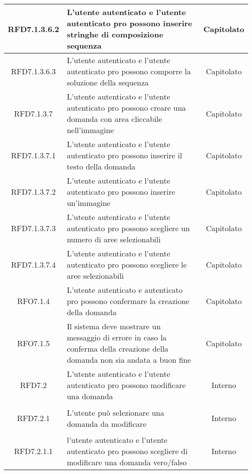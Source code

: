\begin{longtable}{|c|>{\centering}m{7cm}|c|}
\hypertarget{RFD7.1.3.6.2}{RFD7.1.3.6.2} & L’utente autenticato e l’utente autenticato pro possono inserire stringhe di composizione sequenza & Capitolato
\\ \hline

\hypertarget{RFD7.1.3.6.3}{RFD7.1.3.6.3} & L’utente autenticato e l’utente autenticato pro possono comporre la soluzione della sequenza & Capitolato
\\ \hline

\hypertarget{RFD7.1.3.7}{RFD7.1.3.7} & L’utente autenticato e l’utente autenticato pro possono creare una domanda con area cliccabile nell’immagine & Capitolato
\\ \hline

\hypertarget{RFD7.1.3.7.1}{RFD7.1.3.7.1} & L’utente autenticato e l’utente autenticato pro possono inserire il testo della domanda & Capitolato
\\ \hline

\hypertarget{RFD7.1.3.7.2}{RFD7.1.3.7.2} & L’utente autenticato e l’utente autenticato pro possono inserire un’immagine & Capitolato
\\ \hline

\hypertarget{RFD7.1.3.7.3}{RFD7.1.3.7.3} & L’utente autenticato e l’utente autenticato pro possono scegliere un numero di aree selezionabili & Capitolato
\\ \hline

\hypertarget{RFD7.1.3.7.4}{RFD7.1.3.7.4} & L’utente autenticato e l’utente autenticato pro possono scegliere le aree  selezionabili & Capitolato
\\ \hline

\hypertarget{RFO7.1.4}{RFO7.1.4} & L’utente autenticato e autenticato pro possono confermare la creazione della domanda & Capitolato
\\ \hline

\hypertarget{RFO7.1.5}{RFO7.1.5} & Il sistema deve mostrare un messaggio di errore in caso la conferma della creazione della domanda non sia andata a buon fine & Capitolato
\\ \hline

\hypertarget{RFD7.2}{RFD7.2} & L’utente autenticato e l’utente autenticato pro possono modificare una domanda & Interno
\\ \hline

\hypertarget{RFD7.2.1}{RFD7.2.1} & L’utente può selezionare una domanda da modificare & Interno
\\ \hline

\hypertarget{RFD7.2.1.1}{RFD7.2.1.1} & l’utente autenticato e l’utente autenticato pro possono scegliere di modificare una domanda vero/falso & Interno
\\ \hline


\end{longtable}
